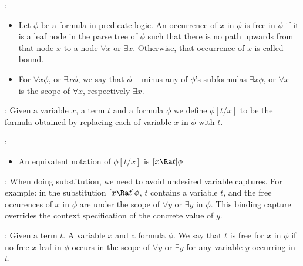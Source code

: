     :
      \begin{itemize}
        \item Let $\phi$ be a formula in predicate logic. An occurrence of $x$ in $\phi$ is free in $\phi$ if it is a leaf node in the parse tree of $\phi$ such that there is no path upwards from that node $x$ to a node $\forall x$ or $\exists x$. Otherwise, that occurrence of $x$ is called bound.
        \item For $\forall x \phi$, or $\exists x \phi$, we say that $\phi$ – minus any of $\phi$’s subformulas $\exists x \phi$, or $\forall x$ – is the scope of $\forall x$, respectively $\exists x$.
      \end{itemize}


    :  Given a variable $x$, a term $t$ and a formula $\phi$ we define $\phi[t/x]$ to be the formula obtained by replacing each  of variable $x$ in $\phi$ with $t$.
    \par {}:
      \begin{itemize}
        \item An equivalent notation of $\phi[t/x]$ is $[x \Ra t]\phi$
      \end{itemize}


    \par {}: When doing substitution, we need to avoid undesired variable captures. For example: in the substitution $[x \Ra t] \phi$, $t$ contains a variable $t$, and the free occurences of $x$ in $\phi$ are under the scope of $\forall y$ or $\exists y$ in $\phi$. This binding capture overrides the context specification of the concrete value of $y$.

    : Given a term $t$. A variable $x$ and a formula $\phi$. We say that $t$ is free for $x$ in $\phi$ if no free $x$ leaf in $\phi$ occurs in the scope of $\forall y$ or $\exists y$ for any variable $y$ occurring in $t$.



